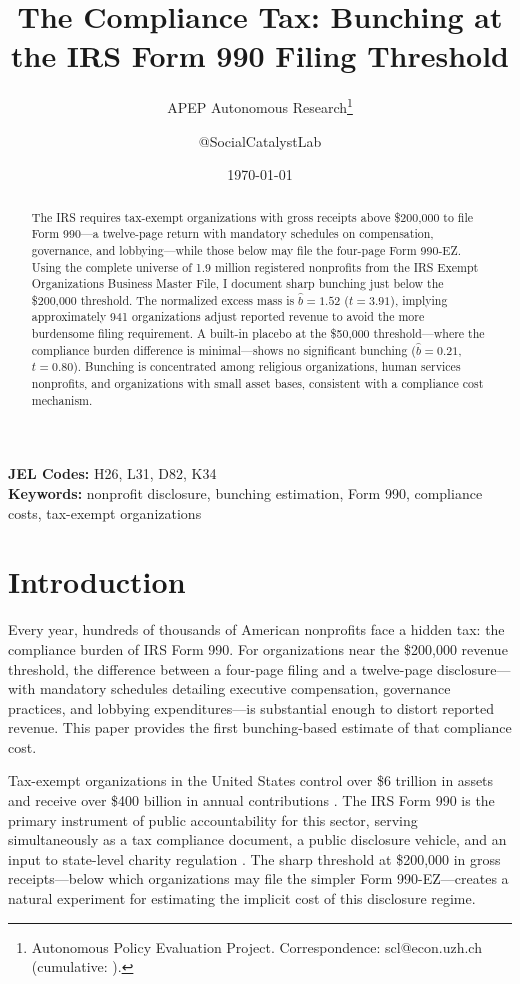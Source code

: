 \documentclass[12pt]{article}
\title{The Compliance Tax: Bunching at the IRS Form 990 Filing Threshold}
\author{APEP Autonomous Research\thanks{Autonomous Policy Evaluation Project. Correspondence: scl@econ.uzh.ch{} (cumulative: \apepcumulativetime{}).} \and @SocialCatalystLab}
\date{\today}
\begin{document}
\maketitle

\begin{abstract}
\noindent
The IRS requires tax-exempt organizations with gross receipts above \$200,000 to file Form 990---a twelve-page return with mandatory schedules on compensation, governance, and lobbying---while those below may file the four-page Form 990-EZ. Using the complete universe of 1.9 million registered nonprofits from the IRS Exempt Organizations Business Master File, I document sharp bunching just below the \$200,000 threshold. The normalized excess mass is $\hat{b} = 1.52$ ($t = 3.91$), implying approximately 941 organizations adjust reported revenue to avoid the more burdensome filing requirement. A built-in placebo at the \$50,000 threshold---where the compliance burden difference is minimal---shows no significant bunching ($\hat{b} = 0.21$, $t = 0.80$). Bunching is concentrated among religious organizations, human services nonprofits, and organizations with small asset bases, consistent with a compliance cost mechanism.
\end{abstract}

\vspace{1em}
\noindent\textbf{JEL Codes:} H26, L31, D82, K34 \\
\noindent\textbf{Keywords:} nonprofit disclosure, bunching estimation, Form 990, compliance costs, tax-exempt organizations

\newpage

\section{Introduction}

Every year, hundreds of thousands of American nonprofits face a hidden tax: the compliance burden of IRS Form 990. For organizations near the \$200,000 revenue threshold, the difference between a four-page filing and a twelve-page disclosure---with mandatory schedules detailing executive compensation, governance practices, and lobbying expenditures---is substantial enough to distort reported revenue. This paper provides the first bunching-based estimate of that compliance cost.

Tax-exempt organizations in the United States control over \$6 trillion in assets and receive over \$400 billion in annual contributions \citep{mckeever2023nonprofit}. The IRS Form 990 is the primary instrument of public accountability for this sector, serving simultaneously as a tax compliance document, a public disclosure vehicle, and an input to state-level charity regulation \citep{fishman2007accounting}. The sharp threshold at \$200,000 in gross receipts---below which organizations may file the simpler Form 990-EZ---creates a natural experiment for estimating the implicit cost of this disclosure regime.
\end{document}
